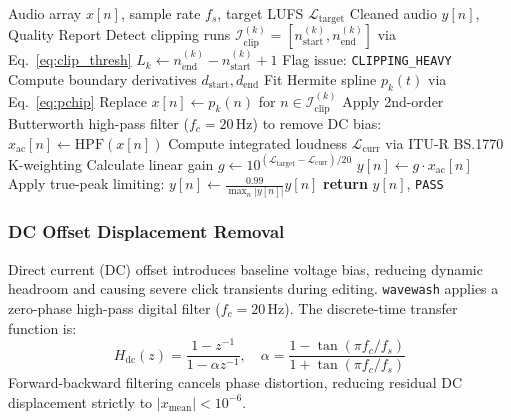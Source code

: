 \documentclass[10pt,journal,compsoc]{IEEEtran}
\begin{document}
\begin{algorithm}[t]
\caption{\texttt{wavewash}: Spline De-Clipping and QC Pipeline}
\label{alg:wavewash}
\begin{algorithmic}[1]
\REQUIRE Audio array $x[n]$, sample rate $f_s$, target LUFS $\mathcal{L}_{\text{target}}$
\ENSURE Cleaned audio $y[n]$, Quality Report
\STATE Detect clipping runs $\mathcal{I}_{\text{clip}}^{(k)} = [n_{\text{start}}^{(k)}, n_{\text{end}}^{(k)}]$ via Eq.~\eqref{eq:clip_thresh}
    \STATE $L_k \leftarrow n_{\text{end}}^{(k)} - n_{\text{start}}^{(k)} + 1$
        \STATE Flag issue: \texttt{CLIPPING\_HEAVY}
    \ELSE
        \STATE Compute boundary derivatives $d_{\text{start}}, d_{\text{end}}$
        \STATE Fit Hermite spline $p_k(t)$ via Eq.~\eqref{eq:pchip}
        \STATE Replace $x[n] \leftarrow p_k(n)$ for $n \in \mathcal{I}_{\text{clip}}^{(k)}$
    \ENDIF
\ENDFOR
\STATE Apply 2nd-order Butterworth high-pass filter ($f_c = 20$\,Hz) to remove DC bias: $x_{\text{ac}}[n] \leftarrow \text{HPF}(x[n])$
\STATE Compute integrated loudness $\mathcal{L}_{\text{curr}}$ via ITU-R BS.1770 K-weighting
\STATE Calculate linear gain $g \leftarrow 10^{(\mathcal{L}_{\text{target}} - \mathcal{L}_{\text{curr}})/20}$
\STATE $y[n] \leftarrow g \cdot x_{\text{ac}}[n]$
    \STATE Apply true-peak limiting: $y[n] \leftarrow \frac{0.99}{\max_n |y[n]|} y[n]$
\ENDIF
\STATE \textbf{return} $y[n]$, \texttt{PASS}
\end{algorithmic}
\end{algorithm}

\subsubsection{DC Offset Displacement Removal}
Direct current (DC) offset introduces baseline voltage bias, reducing dynamic headroom and causing severe click transients during editing. \texttt{wavewash} applies a zero-phase high-pass digital filter ($f_c = 20$\,Hz). The discrete-time transfer function is:
\begin{equation}
H_{\text{dc}}(z) = \frac{1 - z^{-1}}{1 - \alpha z^{-1}}, \quad \alpha = \frac{1 - \tan(\pi f_c / f_s)}{1 + \tan(\pi f_c / f_s)}
\label{eq:dc_filter}
\end{equation}
Forward-backward filtering cancels phase distortion, reducing residual DC displacement strictly to $|x_{\text{mean}}| < 10^{-6}$.
\end{document}

